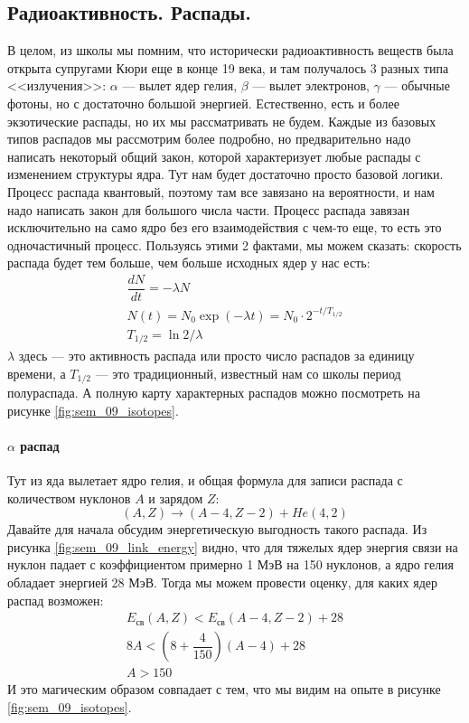\documentclass[12pt]{article}
\begin{document}
\subsection{Радиоактивность. Распады.}
В целом, из школы мы помним, что исторически радиоактивность веществ была открыта супругами Кюри еще в конце 19 века, и там получалось 3 разных типа <<излучения>>: $\alpha$ --- вылет ядер гелия, $\beta$ --- вылет электронов,  $\gamma$ --- обычные фотоны, но с достаточно большой энергией. Естественно, есть и более экзотические распады, но их мы рассматривать не будем. Каждые из базовых типов распадов мы рассмотрим более подробно, но предварительно надо написать некоторый общий закон, которой характеризует любые распады с изменением структуры ядра. Тут нам будет достаточно просто базовой логики. Процесс распада квантовый, поэтому там все завязано на вероятности, и нам надо написать закон для большого числа части. Процесс распада завязан исключительно на само ядро без его взаимодействия с чем-то еще, то есть это одночастичный процесс. Пользуясь этими 2 фактами, мы можем сказать: скорость распада будет тем больше, чем больше исходных ядер у нас есть:
\begin{gather*}
\dfrac{dN}{dt} = -\lambda N\\
N(t) = N_0 \exp{(-\lambda t)} = N_0\cdot 2^{-t/T_{1/2}}\\
T_{1/2} = \ln{2} / \lambda
\end{gather*}
$\lambda$ здесь --- это активность распада или просто число распадов за единицу времени, а $T_{1/2}$ --- это традиционный, известный нам со школы период полураспада. А полную карту характерных распадов можно посмотреть на рисунке \ref{fig:sem_09_isotopes}.

\paragraph{$\alpha$ распад}
Тут из яда вылетает ядро гелия, и общая формула для записи распада с количеством нуклонов $A$ и зарядом $Z$: 
\begin{equation*}
    (A,Z) \rightarrow (A-4, Z-2) + He(4,2)
\end{equation*}
Давайте для начала обсудим энергетическую выгодность такого распада. Из рисунка \ref{fig:sem_09_link_energy} видно, что для тяжелых ядер энергия связи на нуклон падает с коэффициентом примерно 1 МэВ на 150 нуклонов, а ядро гелия обладает энергией 28 МэВ. Тогда мы можем провести оценку, для каких ядер распад возможен:
\begin{gather*}
    E_{\text{св}}(A, Z) < E_{\text{св}}(A-4, Z-2) +28\\
    8A < \left (8 + \dfrac{4}{150} \right) (A-4) + 28\\
    A > 150
\end{gather*}
И это магическим образом совпадает с тем, что мы видим на опыте в рисунке \ref{fig:sem_09_isotopes}. 
\end{document}
